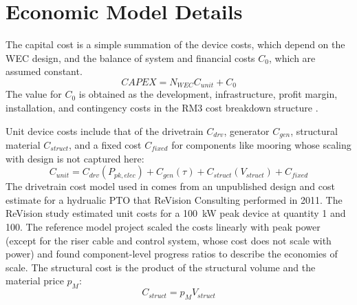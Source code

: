\section{Economic Model Details}
\label{sec:appendix-econ}
The capital cost is a simple summation of the device costs, which depend on the WEC design, and the balance of system and financial costs $C_0$, which are assumed constant.
\begin{equation}
	CAPEX = N_{WEC}C_{unit} + C_0
\end{equation}
The value for $C_0$ is obtained as the development, infrastructure, profit margin, installation, and contingency costs in the RM3 cost breakdown structure \cite{neary_reference_2014}.

Unit device costs include that of the drivetrain $C_{drv}$, generator $C_{gen}$, structural material $C_{struct}$, and a fixed cost $C_{fixed}$ for components like mooring whose scaling with design is not captured here:
\begin{equation}
    C_{unit} =  C_{drv}(P_{pk,elec}) + C_{gen}(\tau) + C_{struct}(V_{struct}) + C_{fixed}
\end{equation}
The drivetrain cost model used in \cite{RM3} comes from an unpublished design and cost estimate for a hydrualic PTO that ReVision Consulting performed in 2011.
The ReVision study estimated unit costs for a 100~kW peak device at quantity 1 and 100.
The reference model project scaled the costs linearly with peak power (except for the riser cable and control system, whose cost does not scale with power) and found component-level progress ratios to describe the economies of scale.
The structural cost is the product of the structural volume and the material price $p_M$:
\begin{equation}
    C_{struct} = p_M V_{struct}
\end{equation}


